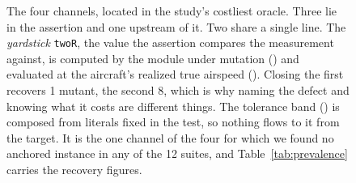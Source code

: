 \documentclass[12pt]{article}
\DeclareRobustCommand{\chnum}[1]{\ding{\ifcase#1\or172\or173\or174\or175\fi}}
\begin{document}
\begin{figure}[t]
\caption{The four channels, located in the study's costliest oracle. Three lie in
the assertion and one upstream of it. Two share a single line. The \emph{yardstick} \texttt{twoR}, the value the
assertion compares the measurement against, is computed by the module under
mutation (\chnum{1}) and evaluated
at the aircraft's realized true airspeed (\chnum{3}). Closing the first recovers
1 mutant, the second 8, which is why naming the defect and knowing what it costs
are different things. The tolerance band (\chnum{2}) is composed from literals
fixed in the test, so nothing flows to it from the target. It is the one channel
of the four for which we found no anchored instance in any of the 12 suites, and
Table~\ref{tab:prevalence} carries the recovery figures.}
\label{fig:channels}
\end{figure}
\end{document}
